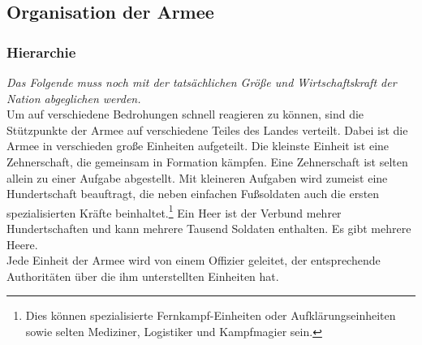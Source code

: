 \subsection{Organisation der Armee}
\subsubsection{Hierarchie}
\emph{Das Folgende muss noch mit der tatsächlichen Größe und Wirtschaftskraft der Nation abgeglichen werden.}\\
Um auf verschiedene Bedrohungen schnell reagieren zu können, sind die Stützpunkte der Armee auf verschiedene Teiles des Landes verteilt. 
Dabei ist die Armee in verschieden große Einheiten aufgeteilt. Die kleinste Einheit ist eine Zehnerschaft, die gemeinsam in Formation kämpfen. 
Eine Zehnerschaft ist selten allein zu einer Aufgabe abgestellt. Mit kleineren Aufgaben wird zumeist eine Hundertschaft beauftragt, die neben einfachen 
Fußsoldaten auch die ersten spezialisierten Kräfte beinhaltet.\footnote{Dies können spezialisierte Fernkampf-Einheiten oder Aufklärungseinheiten sowie selten Mediziner, Logistiker und Kampfmagier sein.} 
Ein Heer ist der Verbund mehrer Hundertschaften und kann mehrere Tausend Soldaten enthalten. Es gibt mehrere Heere.\\
Jede Einheit der Armee wird von einem Offizier geleitet, der entsprechende Authoritäten über die ihm unterstellten Einheiten hat.
